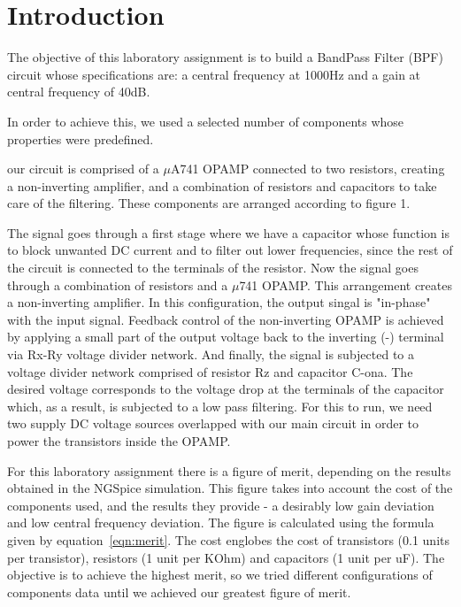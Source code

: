 \section{Introduction}
\label{sec:introduction}
The objective of this laboratory assignment is to build a BandPass Filter (BPF) circuit whose specifications are: a central frequency at 1000Hz and a gain at central frequency of 40dB.

In order to achieve this, we used a selected number of components whose properties were predefined.


our circuit is comprised of a $\mu$A741 OPAMP connected to two resistors, creating a non-inverting amplifier, and a combination of resistors and capacitors to take care of the filtering. These components are arranged according to figure 1.

The signal goes through a first stage where we have a capacitor whose function is to block unwanted DC current and to filter out lower frequencies, since the rest of the circuit is connected to the terminals of the resistor. Now the signal goes through a combination of resistors and a $\mu$741 OPAMP. This arrangement creates a non-inverting amplifier. In this configuration, the output singal is "in-phase" with the input signal. Feedback control of the non-inverting OPAMP is achieved by applying a small part of the output voltage back to the inverting (-) terminal via Rx-Ry voltage divider network. And finally, the signal is subjected to a voltage divider network comprised of resistor Rz and capacitor C-ona. The desired voltage corresponds to the voltage drop at the terminals of the capacitor which, as a result, is subjected to a low pass filtering. For this to run, we need two supply DC voltage sources overlapped with our main circuit in order to power the transistors inside the OPAMP.


For this laboratory assignment there is a figure of merit, depending on the results obtained in the NGSpice simulation. This figure takes into account the cost of the components used, and the results they provide - a desirably low gain deviation and low central frequency deviation. The figure is calculated using the formula given by equation~\ref{eqn:merit}. The cost englobes the cost of transistors (0.1 units per transistor), resistors (1 unit per KOhm) and capacitors (1 unit per uF). The objective is to achieve the highest merit, so we tried different configurations of components data until we achieved our greatest figure of merit.


